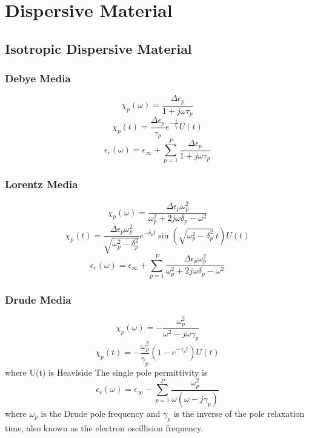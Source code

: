 \section{Dispersive Material}


\subsection{Isotropic Dispersive Material}


\subsubsection{Debye Media}
\begin{equation}
  \chi_p(\omega) = \frac{\Delta\epsilon_p}{1+j\omega\tau_p}  
\end{equation}
\begin{equation}
  \chi_p(t) = \frac{\Delta \epsilon_p}{\tau_p} e^{-\frac{t}{\tau_p}}U(t)  
\end{equation}
\begin{equation}
  \epsilon_r(\omega) = \epsilon_{\infty} + \sum_{p=1}^P \frac{\Delta\epsilon_p}{1+j\omega\tau_p}  
\end{equation}



\subsubsection{Lorentz Media}
\begin{equation}
  \chi_p(\omega) = \frac{\Delta\epsilon_p\omega_p^2}{\omega_p^2 + 2j\omega\delta_p - \omega^2}  
\end{equation}
\begin{equation}
  \chi_p(t) = \frac{\Delta \epsilon_p \omega_p^2}{\sqrt{\omega_p^2 - \delta_p^2}}e^{-\delta_p t}\sin\left(\sqrt{\omega_p^2-\delta_p^2}\ t\right)U(t)
\end{equation}
\begin{equation}
  \epsilon_r(\omega) = \epsilon_{\infty} + \sum_{p=1}^P \frac{\Delta\epsilon_p\omega_p^2}{\omega_p^2 + 2j\omega\delta_p - \omega^2}  
\end{equation}


\subsubsection{Drude Media}
\begin{equation}
  \chi_p(\omega) = -\frac{\omega_p^2}{\omega^2 - j\omega\gamma_p}  
\end{equation}
\begin{equation}
  \chi_p(t) = -\frac{\omega_p^2}{\gamma_p}\left(1-e^{-\gamma_p t}\right) U(t)
\end{equation}
where U(t) is Heaviside
The single pole permittivity is 
\begin{equation}
  \epsilon_r(\omega) = \epsilon_{\infty} - \sum_{p=1}^P \frac{\omega_p^2}{\omega(\omega-j\gamma_p)}
\end{equation}
where $\omega_p$ is the Drude pole frequency and $\gamma_p$ is the inverse of the pole relaxation time, also known as the
electron oscillision frequency.



